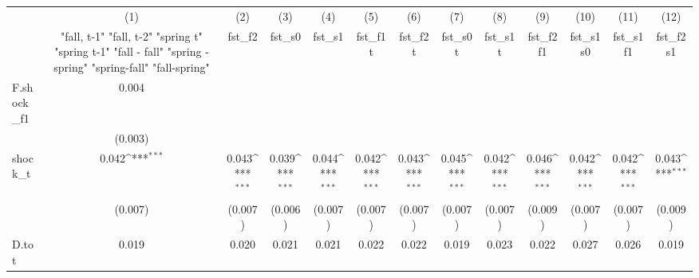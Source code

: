 {
\def\sym#1{\ifmmode^{#1}\else\(^{#1}\)\fi}
\begin{tabular}{l*{12}{c}}
\toprule
            &\multicolumn{1}{c}{(1)}&\multicolumn{1}{c}{(2)}&\multicolumn{1}{c}{(3)}&\multicolumn{1}{c}{(4)}&\multicolumn{1}{c}{(5)}&\multicolumn{1}{c}{(6)}&\multicolumn{1}{c}{(7)}&\multicolumn{1}{c}{(8)}&\multicolumn{1}{c}{(9)}&\multicolumn{1}{c}{(10)}&\multicolumn{1}{c}{(11)}&\multicolumn{1}{c}{(12)}\\
            &\multicolumn{1}{c}{  "fall, t-1" "fall, t-2" "spring t" "spring t-1"  "fall - fall" "spring - spring" "spring-fall" "fall-spring" }&\multicolumn{1}{c}{fst\_f2}&\multicolumn{1}{c}{fst\_s0}&\multicolumn{1}{c}{fst\_s1}&\multicolumn{1}{c}{fst\_f1t}&\multicolumn{1}{c}{fst\_f2t}&\multicolumn{1}{c}{fst\_s0t}&\multicolumn{1}{c}{fst\_s1t}&\multicolumn{1}{c}{fst\_f2f1}&\multicolumn{1}{c}{fst\_s1s0}&\multicolumn{1}{c}{fst\_s1f1}&\multicolumn{1}{c}{fst\_f2s1}\\
\midrule
F.shock\_f1  &       0.004         &                     &                     &                     &                     &                     &                     &                     &                     &                     &                     &                     \\
            &     (0.003)         &                     &                     &                     &                     &                     &                     &                     &                     &                     &                     &                     \\
\addlinespace
shock\_t     &       0.042\sym{***}&       0.043\sym{***}&       0.039\sym{***}&       0.044\sym{***}&       0.042\sym{***}&       0.043\sym{***}&       0.045\sym{***}&       0.042\sym{***}&       0.046\sym{***}&       0.042\sym{***}&       0.042\sym{***}&       0.043\sym{***}\\
            &     (0.007)         &     (0.007)         &     (0.006)         &     (0.007)         &     (0.007)         &     (0.007)         &     (0.007)         &     (0.007)         &     (0.009)         &     (0.007)         &     (0.007)         &     (0.009)         \\
\addlinespace
D.tot       &       0.019         &       0.020         &       0.021         &       0.021         &       0.022         &       0.022         &       0.019         &       0.023         &       0.022         &       0.027         &       0.026         &       0.019         \\

\end{tabular}}
